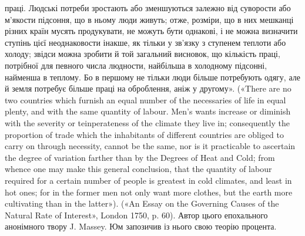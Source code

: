 праці. Людські потреби зростають або зменшуються залежно від суворости
або м’якости підсоння, що в ньому люди живуть; отже, розміри, що в
них мешканці різних країн мусять продукувати, не можуть бути однакові,
і не можна визначити ступінь цієї неоднаковости інакше, як тільки у
зв’язку з ступенем теплоти або холоду; звідси можна зробити й той загальний
висновок, що кількість праці, потрібної для певного числа людности,
найбільша в холодному підсонні, найменша в теплому. Бо в першому
не тільки люди більше потребують одягу, але й земля потребує
більше праці на оброблення, аніж у другому». («There are no two countries
which furnish an equal number of the necessaries of life in equal plenty,
and with the same quantity of labour. Men’s wants increase or diminish
with the severity or teinperateness of the climate they live in; consequently
the proportion of trade which the inhabitants of different countries are
obliged to carry on through necessity, cannot be the same, nor is it practicable
to ascertain the degree of variation farther than by the Degrees of
Heat and Cold; from whence one may make this general conclusion, that
the quantity of labour required for a certain number of people is greatest
in cold climates, and least in hot ones; for in the former men not only want
more clothes, but the earth more cultivating than in the latter»). («An
Essay on the Governing Causes of the Natural Rate of Interest», London
1750, p. 60). Автор цього епохального анонімного твору J. Massey.
Юм запозичив із нього свою теорію процента.
\parbreak{}  %
